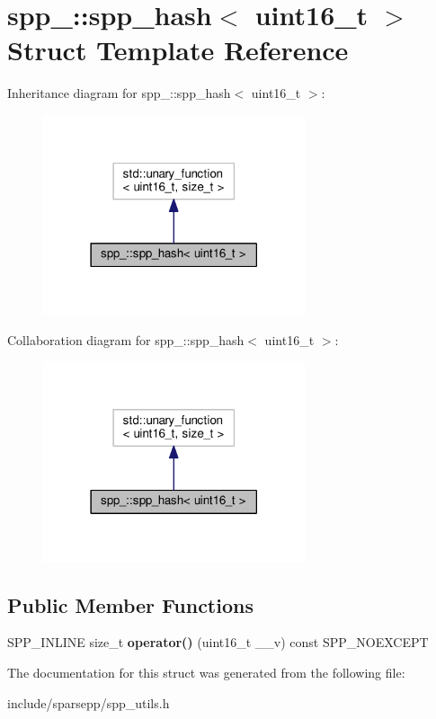 \hypertarget{structspp___1_1spp__hash_3_01uint16__t_01_4}{}\section{spp\+\_\+\+:\+:spp\+\_\+hash$<$ uint16\+\_\+t $>$ Struct Template Reference}
\label{structspp___1_1spp__hash_3_01uint16__t_01_4}


Inheritance diagram for spp\+\_\+\+:\+:spp\+\_\+hash$<$ uint16\+\_\+t $>$\+:\nopagebreak
\begin{figure}[H]
\begin{center}
\leavevmode
\includegraphics[width=218pt]{structspp___1_1spp__hash_3_01uint16__t_01_4__inherit__graph}
\end{center}
\end{figure}


Collaboration diagram for spp\+\_\+\+:\+:spp\+\_\+hash$<$ uint16\+\_\+t $>$\+:\nopagebreak
\begin{figure}[H]
\begin{center}
\leavevmode
\includegraphics[width=218pt]{structspp___1_1spp__hash_3_01uint16__t_01_4__coll__graph}
\end{center}
\end{figure}
\subsection*{Public Member Functions}
\begin{DoxyCompactItemize}
\item 
S\+P\+P\+\_\+\+I\+N\+L\+I\+NE size\+\_\+t {\bfseries operator()} (uint16\+\_\+t \+\_\+\+\_\+v) const S\+P\+P\+\_\+\+N\+O\+E\+X\+C\+E\+PT\hypertarget{structspp___1_1spp__hash_3_01uint16__t_01_4_abd580cce2a9f75bf061cd8f74925ea6f}{}\label{structspp___1_1spp__hash_3_01uint16__t_01_4_abd580cce2a9f75bf061cd8f74925ea6f}

\end{DoxyCompactItemize}


The documentation for this struct was generated from the following file\+:\begin{DoxyCompactItemize}
\item 
include/sparsepp/spp\+\_\+utils.\+h\end{DoxyCompactItemize}
